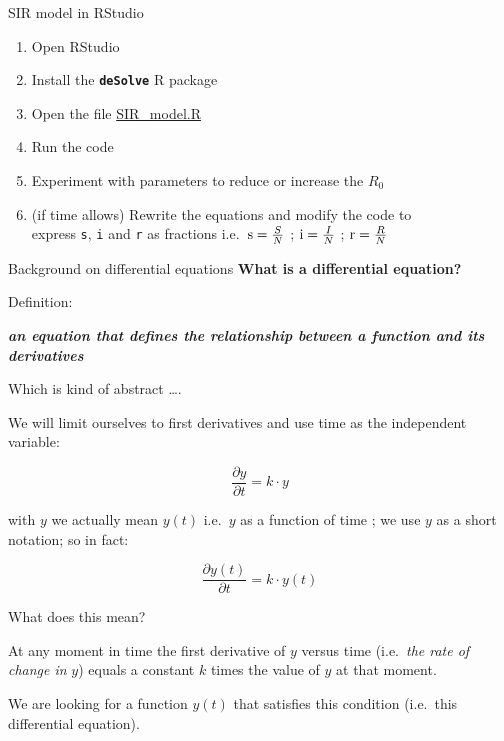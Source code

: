 \documentclass[
  ignorenonframetext,
]{beamer}
\providecommand{\tightlist}{%
  \setlength{\itemsep}{0pt}\setlength{\parskip}{0pt}}
\begin{document}
\begin{frame}[fragile]{SIR model in RStudio}
\protect\hypertarget{sir-model-in-rstudio}{}
\begin{enumerate}
\tightlist
\item
  Open RStudio
\item
  Install the \textbf{\texttt{deSolve}} R package
\item
  Open the file \href{./R/SIR_model.R}{SIR\_model.R}
\item
  Run the code
\item
  Experiment with parameters to reduce or increase the \(R_0\)
\item
  (if time allows) Rewrite the equations and modify the code to\\
  express \texttt{s}, \texttt{i} and \texttt{r} as fractions
  i.e.~\(\text s = \frac S N\) ; \(\text i = \frac I N\) ;
  \(\text r = \frac R N\)
\end{enumerate}
\end{frame}

\begin{frame}{Background on differential equations}
\protect\hypertarget{background-on-differential-equations}{}
\textbf{What is a differential equation?}

Definition:

\textbf{\emph{an equation that defines the relationship between a
function and its derivatives}}

Which is kind of abstract \ldots.

We will limit ourselves to first derivatives and use time as the
independent variable:

\[\frac {\partial y} {\partial t} = k \cdot y\]

with \(y\) we actually mean \(y(t)\) i.e.~\(y\) as a function of time ;
we use \(y\) as a short notation; so in fact:

\[\frac {\partial y(t)} {\partial t} = k \cdot y(t)\]

What does this mean?

At any moment in time the first derivative of \(y\) versus time
(i.e.~\emph{the rate of change in} \(y\)) equals a constant \(k\) times
the value of \(y\) at that moment.

We are looking for a function \(y(t)\) that satisfies this condition
(i.e.~this differential equation).
\end{frame}
\end{document}
